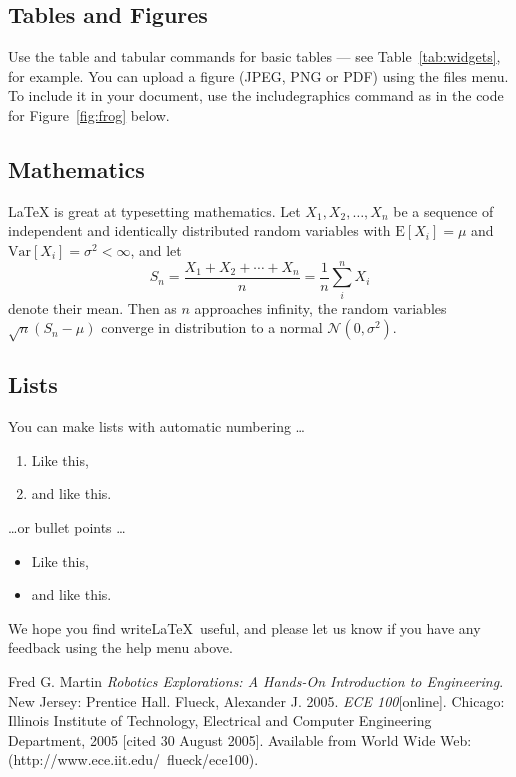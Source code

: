 \subsection{Tables and Figures}

Use the table and tabular commands for basic tables --- see Table~\ref{tab:widgets}, for example. You can upload a figure (JPEG, PNG or PDF) using the files menu. To include it in your document, use the includegraphics command as in the code for Figure~\ref{fig:frog} below.


\subsection{Mathematics}

\LaTeX{} is great at typesetting mathematics. Let $X_1, X_2, \ldots, X_n$ be a sequence of independent and identically distributed random variables with $\text{E}[X_i] = \mu$ and $\text{Var}[X_i] = \sigma^2 < \infty$, and let
$$S_n = \frac{X_1 + X_2 + \cdots + X_n}{n}
      = \frac{1}{n}\sum_{i}^{n} X_i$$
denote their mean. Then as $n$ approaches infinity, the random variables $\sqrt{n}(S_n - \mu)$ converge in distribution to a normal $\mathcal{N}(0, \sigma^2)$.

\subsection{Lists}

You can make lists with automatic numbering \dots

\begin{enumerate}
\item Like this,
\item and like this.
\end{enumerate}
\dots or bullet points \dots
\begin{itemize}
\item Like this,
\item and like this.
\end{itemize}

We hope you find write\LaTeX\ useful, and please let us know if you have any feedback using the help menu above.

\begin{thebibliography}{9}
	 Fred G. Martin \emph{Robotics Explorations: A Hands-On Introduction to Engineering}. New Jersey: Prentice Hall.
	  Flueck, Alexander J. 2005. \emph{ECE 100}[online]. Chicago: Illinois Institute of Technology, Electrical and Computer Engineering Department, 2005 [cited 30
	August 2005]. Available from World Wide Web: (http://www.ece.iit.edu/~flueck/ece100).
\end{thebibliography}

